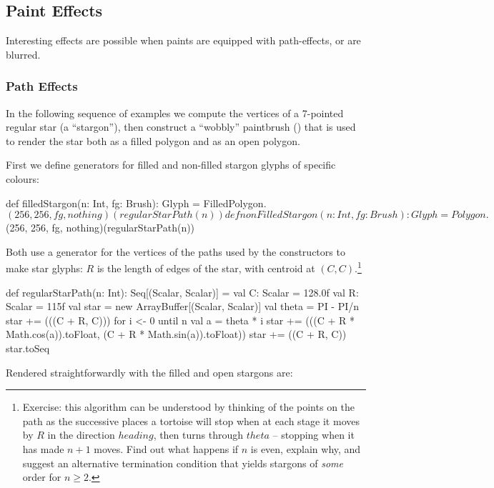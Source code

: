 \documentclass[12pt,a4paper]{article}
\def\SS#1{\subsection{#1}}
\def\SSS#1{\subsubsection*{#1}}
\begin{document}

\SS{Paint Effects}
Interesting effects are possible when paints are equipped with
path-effects, or are blurred.

\SSS{Path Effects}
In the following sequence of examples we compute the
vertices of a 7-pointed regular star (a ``stargon''), then construct
a ``wobbly'' paintbrush () that is used to render
the star both as a filled polygon and as an open polygon.


First we define generators for filled and non-filled stargon glyphs
of specific colours:

\begin{scala}
 def filledStargon(n: Int, fg: Brush): Glyph =
     FilledPolygon.$(256, 256, fg, nothing)(regularStarPath(n))                        
   
 def nonFilledStargon(n: Int, fg: Brush): Glyph =
     Polygon.$(256, 256, fg, nothing)(regularStarPath(n))                    
\end{scala}


Both use a generator for the vertices of the paths used by
the  constructors to make star glyphs: $R$ is the
length of edges of the star, with centroid at $(C,C)$.\footnote{Exercise: this
algorithm can be understood by thinking of the points on
the path as the successive places a tortoise will stop when
at each stage it moves by $R$ in the direction $heading$, then turns through
$theta$ -- stopping when it has made $n+1$ moves.
Find out what happens if $n$ is even, explain why, and suggest
an alternative termination condition that yields stargons of \textit{some} order for
$n\ge{}2$. }

\begin{scala}
def regularStarPath(n: Int): Seq[(Scalar, Scalar)] = {
    val C: Scalar = 128.0f
    val R: Scalar = 115f
    val star = new ArrayBuffer[(Scalar, Scalar)]
    val theta = PI - PI/n
    star += (((C + R, C)))
    for {i <- 0 until n} {
      val a = theta * i
      star += (((C + R * Math.cos(a)).toFloat, (C + R * Math.sin(a)).toFloat))
    }
    star += ((C + R, C))
    star.toSeq
  }
\end{scala}

Rendered straightforwardly with  the filled and open stargons are:
\begin{center}
\quad\quad
{}
\end{center}
\end{document}
